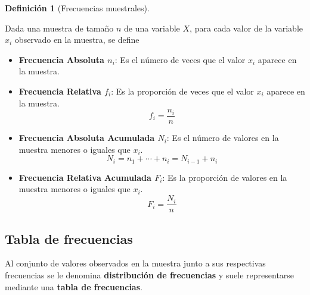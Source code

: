 \documentclass[
  a4paper,
]{scrreport}
\providecommand{\tightlist}{%
  \setlength{\itemsep}{0pt}\setlength{\parskip}{0pt}}\usepackage{longtable,booktabs,array}
\theoremstyle{plain}
\theoremstyle{definition}
\theoremstyle{definition}
\newtheorem{definition}{Definición}[chapter]
\theoremstyle{remark}
\begin{document}
\begin{definition}[Frecuencias
muestrales]\protect\hypertarget{def-frecuencias-muestrales}{}\label{def-frecuencias-muestrales}

Dada una muestra de tamaño \(n\) de una variable \(X\), para cada valor
de la variable \(x_i\) observado en la muestra, se define

\begin{itemize}
\tightlist
\item
  \textbf{Frecuencia Absoluta \(n_i\)}: Es el número de veces que el
  valor \(x_i\) aparece en la muestra.
\item
  \textbf{Frecuencia Relativa \(f_i\)}: Es la proporción de veces que el
  valor \(x_i\) aparece en la muestra. \[f_i = \frac{n_i}{n}\]
\item
  \textbf{Frecuencia Absoluta Acumulada \(N_i\)}: Es el número de
  valores en la muestra menores o iguales que \(x_i\).
  \[N_i = n_1 + \cdots + n_i = N_{i-1}+n_i\]
\item
  \textbf{Frecuencia Relativa Acumulada \(F_i\)}: Es la proporción de
  valores en la muestra menores o iguales que \(x_i\).
  \[F_i = \frac{N_i}{n}\]
\end{itemize}

\end{definition}

\hypertarget{tabla-de-frecuencias}{%
\subsection{Tabla de frecuencias}\label{tabla-de-frecuencias}}

Al conjunto de valores observados en la muestra junto a sus respectivas
frecuencias se le denomina \textbf{distribución de frecuencias} y suele
representarse mediante una \textbf{tabla de frecuencias}.
\end{document}
